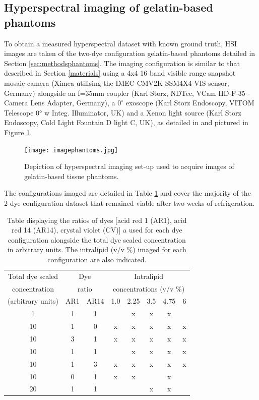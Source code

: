 \subsection{Hyperspectral imaging of gelatin-based phantoms}\label{sec:imagingphantoms}
To obtain a measured hyperspectral dataset with known ground truth, HSI images are taken of the two-dye configuration gelatin-based phantoms detailed in Section \ref{sec:methodsphantoms}. The imaging configuration is similar to that described in Section \ref{materials} using a 4x4 16 band visible range snapshot mosaic camera (Ximea utilising the IMEC CMV2K-SSM4X4-VIS sensor, Germany) alongside an f=35mm coupler (Karl Storz, NDTec, VCam HD-F-35 - Camera Lens Adapter, Germany), a $0^\circ$ exoscope (Karl Storz Endoscopy, VITOM Telescope 0° w Integ. Illuminator, UK) and a Xenon light source (Karl Storz Endoscopy, Cold Light Fountain D light C, UK), as detailed in \cite{Ebner2021} and pictured in Figure \ref{fig:imagephantoms}.
\begin{figure}[h!]
    \centering
    \texttt{[image: imagephantoms.jpg]}
    \caption{Depiction of hyperspectral imaging set-up used to acquire images of gelatin-based tissue phantoms.}
    \label{fig:imagephantoms}
\end{figure}
The configurations imaged are detailed in Table \ref{tb:imagedphantoms} and cover the majority of the 2-dye configuration dataset that remained viable after two weeks of refrigeration. 
\begin{table}[ht!]
    \centering
    \caption{Table displaying the ratios of dyes [acid red 1 (AR1), acid red 14 (AR14), crystal violet (CV)] a used for each dye configuration alongside the total dye scaled concentration in arbitrary units. The intralipid (v/v \%) imaged for each configuration are also indicated.}
    \begin{tabular}{|c|c|c|c|c|c|c|c|}
        \hline
        Total dye scaled & \multicolumn{2}{|c|}{Dye } & \multicolumn{5}{c|}{Intralipid } \\
        concentration & \multicolumn{2}{|c|}{ratio} & \multicolumn{5}{c|}{concentrations (v/v \%)} \\
        (arbitrary units) & AR1 & AR14 & 1.0 & 2.25 & 3.5 & 4.75 & 6 \\
        \hline
        1 & 1 & 1 & & x & x & x & \\
        10 & 1 & 0 & x & x & x & x & x \\
        10 & 3 & 1 & x & x & x & x & x \\
        10 & 1 & 1 &  & x & x & x & x \\
        10 & 1 & 3 & x & x & x & x & x \\
        10 & 0 & 1 & x & x &  & x & \\
        20 & 1 & 1 &  & & x & x &  \\
        \hline
    \end{tabular}
    \label{tb:imagedphantoms}
\end{table}
